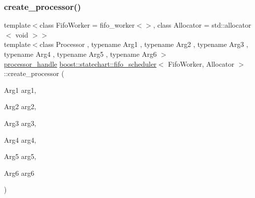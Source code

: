 \mbox{\label{classboost_1_1statechart_1_1fifo__scheduler_a02a1f84cd3e6117100418a6d105587e6}} 
\subsubsection{\texorpdfstring{create\+\_\+processor()}{create\_processor()}\hspace{0.1cm}{\footnotesize\ttfamily [7/7]}}
{\footnotesize\ttfamily template$<$class Fifo\+Worker = fifo\+\_\+worker$<$$>$, class Allocator = std\+::allocator$<$ void $>$$>$ \\
template$<$class Processor , typename Arg1 , typename Arg2 , typename Arg3 , typename Arg4 , typename Arg5 , typename Arg6 $>$ \\
\mbox{\hyperlink{classboost_1_1statechart_1_1fifo__scheduler_ada526939c16c4f8118bc4d7bbf09ad7d}{processor\+\_\+handle}} \mbox{\hyperlink{classboost_1_1statechart_1_1fifo__scheduler}{boost\+::statechart\+::fifo\+\_\+scheduler}}$<$ Fifo\+Worker, Allocator $>$\+::create\+\_\+processor (\begin{DoxyParamCaption}\item[{Arg1}]{arg1,  }\item[{Arg2}]{arg2,  }\item[{Arg3}]{arg3,  }\item[{Arg4}]{arg4,  }\item[{Arg5}]{arg5,  }\item[{Arg6}]{arg6 }\end{DoxyParamCaption})\hspace{0.3cm}{\ttfamily [inline]}}

\mbox{\label{classboost_1_1statechart_1_1fifo__scheduler_a4a25edb5f67e9dd339a6f6cfe6bcc873}} 
